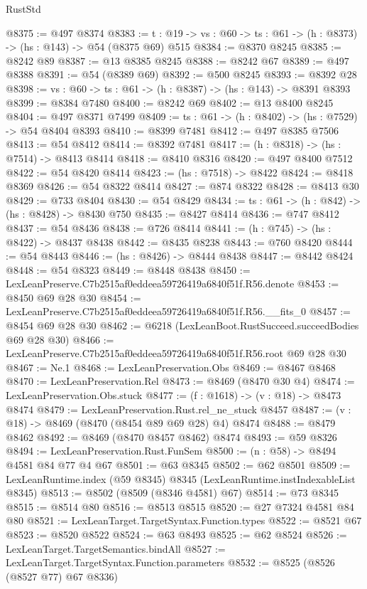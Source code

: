 \begin{lexlean}{RustStd}
\begin{coremodule}
@8375 := @497 @8374
@8383 := {t : @19} -> {vs : @60} -> {ts : @61} -> (h : @8373) -> (hs : @143) -> @54 (@8375 @69) @515
@8384 := @8370 @8245
@8385 := @8242 @89
@8387 := @13 @8385 @8245
@8388 := @8242 @67
@8389 := @497 @8388
@8391 := @54 (@8389 @69)
@8392 := @500 @8245
@8393 := @8392 @28
@8398 := {vs : @60} -> {ts : @61} -> (h : @8387) -> (hs : @143) -> @8391 @8393
@8399 := @8384 @7480
@8400 := @8242 @69
@8402 := @13 @8400 @8245
@8404 := @497 @8371 @7499
@8409 := {ts : @61} -> (h : @8402) -> (hs : @7529) -> @54 @8404 @8393
@8410 := @8399 @7481
@8412 := @497 @8385 @7506
@8413 := @54 @8412
@8414 := @8392 @7481
@8417 := (h : @8318) -> (hs : @7514) -> @8413 @8414
@8418 := @8410 @8316
@8420 := @497 @8400 @7512
@8422 := @54 @8420 @8414
@8423 := (hs : @7518) -> @8422
@8424 := @8418 @8369
@8426 := @54 @8322 @8414
@8427 := @874 @8322
@8428 := @8413 @30
@8429 := @733 @8404
@8430 := @54 @8429
@8434 := {ts : @61} -> (h : @842) -> (hs : @8428) -> @8430 @750
@8435 := @8427 @8414
@8436 := @747 @8412
@8437 := @54 @8436
@8438 := @726 @8414
@8441 := (h : @745) -> (hs : @8422) -> @8437 @8438
@8442 := @8435 @8238
@8443 := @760 @8420
@8444 := @54 @8443
@8446 := (hs : @8426) -> @8444 @8438
@8447 := @8442 @8424
@8448 := @54 @8323
@8449 := @8448 @8438
@8450 := LexLeanPreserve.C7b2515af0eddeea59726419a6840f51f.R56.denote
@8453 := @8450 @69 @28 @30
@8454 := LexLeanPreserve.C7b2515af0eddeea59726419a6840f51f.R56.__fits_0
@8457 := @8454 @69 @28 @30
@8462 := @6218 (LexLeanBoot.RustSucceed.succeedBodies @69 @28 @30)
@8466 := LexLeanPreserve.C7b2515af0eddeea59726419a6840f51f.R56.root @69 @28 @30
@8467 := Ne.{1}
@8468 := LexLeanPreservation.Obs
@8469 := @8467 @8468
@8470 := LexLeanPreservation.Rel
@8473 := @8469 (@8470 @30 @4)
@8474 := LexLeanPreservation.Obs.stuck
@8477 := (f : @1618) -> (v : @18) -> @8473 @8474
@8479 := LexLeanPreservation.Rust.rel_ne_stuck @8457
@8487 := (v : @18) -> @8469 (@8470 (@8454 @89 @69 @28) @4) @8474
@8488 := @8479 @8462
@8492 := @8469 (@8470 @8457 @8462) @8474
@8493 := @59 @8326
@8494 := LexLeanPreservation.Rust.FunSem
@8500 := (n : @58) -> @8494 @4581 @84 @77 @4 @67
@8501 := @63 @8345
@8502 := @62 @8501
@8509 := LexLeanRuntime.index (@59 @8345) @8345 (LexLeanRuntime.instIndexableList @8345)
@8513 := @8502 (@8509 (@8346 @4581) @67)
@8514 := @73 @8345
@8515 := @8514 @80
@8516 := @8513 @8515
@8520 := @27 @7324 @4581 @84 @80
@8521 := LexLeanTarget.TargetSyntax.Function.types
@8522 := @8521 @67
@8523 := @8520 @8522
@8524 := @63 @8493
@8525 := @62 @8524
@8526 := LexLeanTarget.TargetSemantics.bindAll
@8527 := LexLeanTarget.TargetSyntax.Function.parameters
@8532 := @8525 (@8526 (@8527 @77) @67 @8336)

\end{coremodule}
\end{lexlean}
